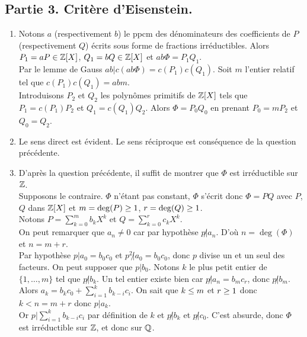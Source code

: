 \subsection*{Partie 3. Critère d'Eisenstein.}
\begin{enumerate}
\item Notons $a$ (respectivement $b$) le ppcm des dénominateurs des coefficients de $P$ (respectivement $Q$) écrits sous forme de fractions irréductibles. Alors $P_1=aP\in\mathbb{Z}[X]$, $Q_1=bQ\in\mathbb{Z}[X]$ et $ab\Phi=P_1Q_1$.\\ Par le lemme de Gauss $ab|c(ab\Phi)=c(P_1)c(Q_1)$. Soit $m$ l'entier relatif tel que $c(P_1)c(Q_1)=abm$.\\ Introduisons $P_2$ et $Q_2$ les polynômes primitifs de $\mathbb{Z}[X]$ tels que $P_1=c(P_1)P_2$ et $Q_1=c(Q_1)Q_2$. Alors $\Phi=P_0Q_0$ en prenant $P_0=mP_2$ et $Q_0=Q_2$. 
\item Le sens direct est évident. Le sens réciproque est conséquence de la question précédente.
\item D'après la question précédente, il suffit de montrer que $\Phi$ est irréductible sur $\mathbb{Z}$.\\
Supposons le contraire. $\Phi$ n'étant pas constant, $\Phi$ s'écrit donc $\Phi=PQ$ avec $P$, $Q$ dans $\mathbb{Z}[X]$  et $m=\deg(P)\geq 1$, $r=\deg(Q)\geq 1$. \\
Notons $P=\sum_{k=0}^mb_kX^k$ et $Q=\sum_{k=0}^rc_kX^k$. \\
On peut remarquer que $a_n\neq 0$ car par hypothèse $p\not|a_n$. D'où $n=\deg(\Phi)$ et $n=m+r$.\\
Par hypothèse $p|a_0=b_0c_0$ et $p^2\not|a_0=b_0c_0$, donc $p$ divise un et un seul des facteurs. On peut supposer  que $p|b_0$. Notons $k$ le plus petit entier de $\{1,\dots,m\}$ tel que $p\not|b_k$. Un tel entier existe bien car $p\not|a_n=b_mc_r$, donc $p\not|b_m$. \\
Alors $a_k=b_kc_0+\sum_{i=1}^kb_{k-i}c_i$. On sait que $k\leq m$ et $r\geq 1$ donc $k< n=m+r$ donc $p|a_k$.\\
Or  $p|\sum_{i=1}^kb_{k-i}c_i$ par définition de $k$ et $p\not|b_k$ et $p\not|c_0$. C'est absurde, donc $\Phi$ est irréductible sur $\mathbb{Z}$, et donc sur $\mathbb{Q}$.
\end{enumerate}

